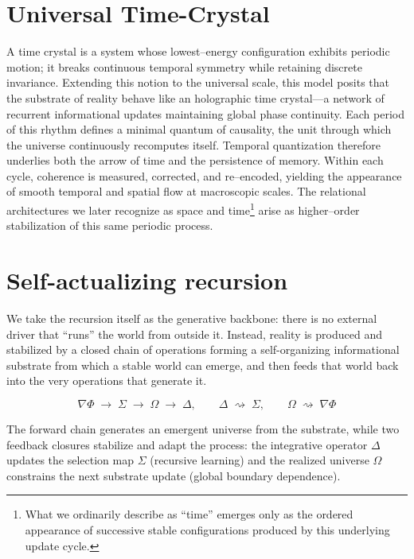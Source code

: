 \documentclass[11pt]{article}
\begin{document}
\section{Universal Time-Crystal}
A time crystal is a system whose lowest–energy configuration exhibits periodic motion; it breaks continuous temporal symmetry while retaining discrete invariance. Extending this notion to the universal scale, this model posits that the substrate of reality behave like an holographic time crystal—a network of recurrent informational updates maintaining global phase continuity. Each period of this rhythm defines a minimal quantum of causality, the unit through which the universe continuously recomputes itself. Temporal quantization therefore underlies both the arrow of time and the persistence of memory. Within each cycle, coherence is measured, corrected, and re–encoded, yielding the appearance of smooth temporal and spatial flow at macroscopic scales. The relational architectures we later recognize as space and time\footnote{What we ordinarily describe as “time” emerges only as the ordered appearance of successive stable configurations produced by this underlying update cycle.} arise as higher–order stabilization of this same periodic process.

\section{Self-actualizing recursion}
\label{sec:self_actualizing_recursion}



We take the recursion itself as the generative backbone: there is no external driver that ``runs'' the world from outside it.
Instead, reality is produced and stabilized by a closed chain of operations forming a self-organizing informational substrate from which a stable world can emerge, and then feeds that world back into the very operations that generate it.








\begin{equation}
\label{eq:self_actualizing_chain}
\nabla\Phi \;\longrightarrow\; \Sigma \;\longrightarrow\; \Omega \;\longrightarrow\; \Delta,
\qquad
\Delta \;\rightsquigarrow\; \Sigma,
\qquad
\Omega \;\rightsquigarrow\; \nabla\Phi
\end{equation}

The forward chain generates an emergent universe from the substrate, while two feedback closures stabilize and adapt the process: the integrative operator $\Delta$ updates the selection map $\Sigma$ (recursive learning) and the realized universe $\Omega$ constrains the next substrate update (global boundary dependence).
\end{document}
